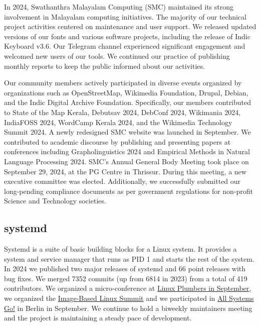 \documentclass[a4paper]{report}
\begin{document}
In 2024, Swathanthra Malayalam Computing (SMC) maintained its strong involvement in Malayalam computing initiatives. The majority of our technical project activities centered on maintenance and user support. We released updated versions of our fonts and various software projects, including the release of Indic Keyboard v3.6. Our Telegram channel experienced significant engagement and welcomed new users of our tools. We continued our practice of publishing monthly reports to keep the public informed about our activities.

Our community members actively participated in diverse events organized by organizations such as OpenStreetMap, Wikimedia Foundation, Drupal, Debian, and the Indic Digital Archive Foundation. Specifically, our members contributed to State of the Map Kerala, Debutsav 2024, DebConf 2024, Wikimania 2024, IndiaFOSS 2024, WordCamp Kerala 2024, and the Wikimedia Technology Summit 2024. A newly redesigned SMC website was launched in September. We contributed to academic discourse by publishing and presenting papers at conferences including Grapholinguistics 2024 and Empirical Methods in Natural Language Processing 2024. SMC's Annual General Body Meeting took place on September 29, 2024, at the PG Centre in Thrissur. During this meeting, a new executive committee was elected. Additionally, we successfully submitted our long-pending compliance documents as per government regulations for non-profit Science and Technology societies.

\subsection{systemd}

Systemd is a suite of basic building blocks for a Linux system. It provides a system and service manager that runs as PID 1 and starts the rest of the system. In 2024 we published two major releases of systemd and 66 point releases with bug fixes. We merged 7352 commits (up from 6814 in 2023) from a total of 419 contributors. We organized a micro-conference at \href{https://lpc.events/event/18/sessions/206/#20240919}{Linux Plumbers in September}, we organized the \href{https://uapi-group.org/docs/minutes/2024-09-24__image-based-linux-summit/}{Image-Based Linux Summit} and we participated in \href{https://cfp.all-systems-go.io/all-systems-go-2024/schedule/}{All Systems Go!} in Berlin in September. We continue to hold a biweekly maintainers meeting and the project is maintaining a steady pace of development.
\end{document}
